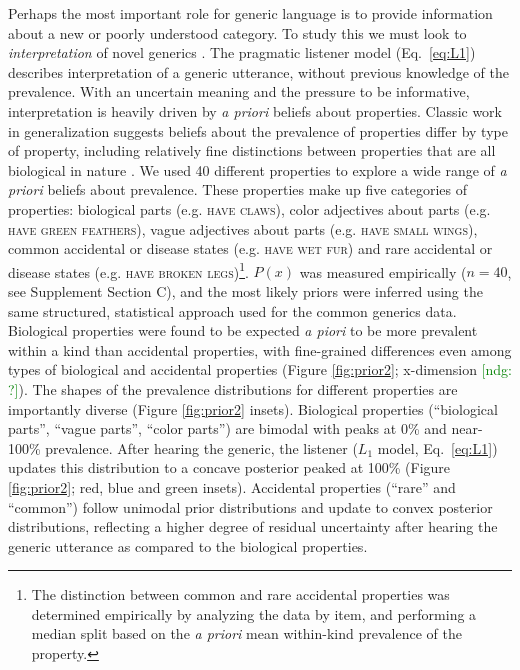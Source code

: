 \documentclass[10pt,letterpaper]{article}
\newcommand{\ndg}[1]{\textcolor{Green}{[ndg: #1]}}
\begin{document}
Perhaps the most important role for generic language is to provide information about a new or poorly understood category. To study this we must look to \emph{interpretation} of novel generics \cite[e.g.]{Cimpian2010,Gelman2002}.
The pragmatic listener model (Eq.~\ref{eq:L1}) describes interpretation of a generic utterance, without previous knowledge of the prevalence. 
With an uncertain meaning and the pressure to be informative, interpretation is heavily driven by \emph{a priori} beliefs about properties. 
Classic work in generalization suggests beliefs about the prevalence of properties differ by type of property, including relatively fine distinctions between properties that are all biological in nature \cite{Nisbett1983}. 
We used 40 different properties to explore a wide range of \emph{a priori} beliefs about prevalence. 
These properties make up five categories of properties: biological parts (e.g. \textsc{have claws}), color adjectives about parts (e.g. \textsc{have green feathers}), vague adjectives about parts (e.g. \textsc{have small wings}),  common accidental or disease states (e.g. \textsc{have wet fur}) and rare accidental or disease states (e.g. \textsc{have broken legs})\footnote{The distinction between common and rare accidental properties was determined empirically by analyzing the data by item, and performing a median split based on the \emph{a priori} mean within-kind prevalence of the property.}.
$P(x)$ was measured empirically ($n=40$, see Supplement Section C), and the most likely priors were inferred using the same structured, statistical approach used for the common generics data.
Biological properties were found to be expected \emph{a piori} to be more prevalent within a kind than accidental properties, with fine-grained differences even among types of biological and accidental properties (Figure \ref{fig:prior2}; x-dimension \ndg{?}).
The shapes of the prevalence distributions for different properties are importantly diverse (Figure \ref{fig:prior2} insets). 
Biological properties (``biological parts'', ``vague parts'', ``color parts'') are bimodal with peaks at 0\% and near-100\% prevalence. 
After hearing the generic, the listener ($L_1$ model, Eq.~\ref{eq:L1}) updates this distribution to a concave posterior  peaked at 100\% (Figure \ref{fig:prior2}; red, blue and green insets). 
Accidental properties (``rare'' and ``common'') follow unimodal prior distributions and update to convex posterior distributions, reflecting a higher degree of residual uncertainty after hearing the generic utterance as compared to the biological properties. 
\end{document}
